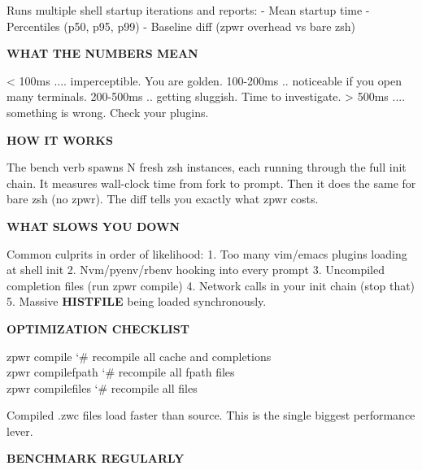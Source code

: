 \documentclass[11pt,a4paper,twoside]{book}
\begin{document}
Runs multiple shell startup iterations and reports: - Mean startup time - Percentiles (p50, p95, p99) - Baseline diff (zpwr overhead vs bare zsh)


\vspace{12pt}
{\bfseries\color{neonyellow} WHAT THE NUMBERS MEAN}\vspace{4pt}

< 100ms .... imperceptible. You are golden. 100-200ms .. noticeable if you open many terminals. 200-500ms .. getting sluggish. Time to investigate. > 500ms .... something is wrong. Check your plugins.


\vspace{12pt}
{\bfseries\color{neonyellow} HOW IT WORKS}\vspace{4pt}

The bench verb spawns N fresh zsh instances, each running through the full init chain. It measures wall-clock time from fork to prompt. Then it does the same for bare zsh (no zpwr). The diff tells you exactly what zpwr costs.


\vspace{12pt}
{\bfseries\color{neonyellow} WHAT SLOWS YOU DOWN}\vspace{4pt}

Common culprits in order of likelihood: 1. Too many vim/emacs plugins loading at shell init 2. Nvm/pyenv/rbenv hooking into every prompt 3. Uncompiled completion files (run zpwr compile) 4. Network calls in your init chain (stop that) 5. Massive \textbf{HISTFILE} being loaded synchronously.


\vspace{12pt}
{\bfseries\color{neonyellow} OPTIMIZATION CHECKLIST}\vspace{4pt}

\begin{codebox}
\color{neongreen}zpwr compile        {\char`\#} recompile all cache and completions\\
\color{neongreen}zpwr compilefpath    {\char`\#} recompile all fpath files\\
\color{neongreen}zpwr compilefiles    {\char`\#} recompile all files\\
\end{codebox}

Compiled .zwc files load faster than source. This is the single biggest performance lever.


\vspace{12pt}
{\bfseries\color{neonyellow} BENCHMARK REGULARLY}\vspace{4pt}
\end{document}
